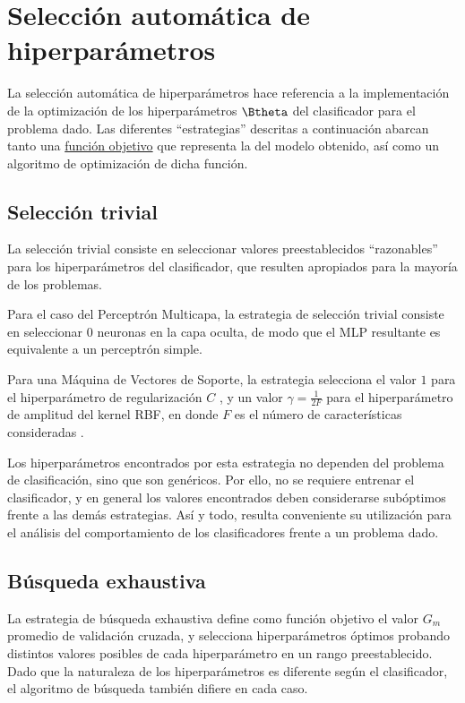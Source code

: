 \section{Selección automática de hiperparámetros}
La selección automática de hiperparámetros hace referencia a la
implementación de la optimización de los hiperparámetros $\Btheta$ del
clasificador para el problema dado.  Las diferentes ``estrategias''
descritas a continuación abarcan tanto una
\hyperref[funcobjetivo]{función objetivo} que representa la
 del modelo obtenido, así como un algoritmo de optimización
de dicha función.

\subsection{Selección trivial}
La selección trivial consiste en seleccionar valores preestablecidos
``razonables'' para los hiperparámetros del clasificador, que resulten
apropiados para la mayoría de los problemas.

Para el caso del Perceptrón Multicapa, la estrategia de selección
trivial consiste en seleccionar $0$ neuronas en la capa oculta, de
modo que el MLP resultante es equivalente a un perceptrón simple.

Para una Máquina de Vectores de Soporte, la estrategia selecciona el
valor $1$ para el hiperparámetro de regularización $C$ \cite{libsvm}, y
un valor $\gamma=\frac{1}{2F}$ para el hiperparámetro de amplitud del
kernel RBF, en donde $F$ es el número de características consideradas
\cite{glasmachersigel}.

Los hiperparámetros encontrados por esta estrategia no dependen del
problema de clasificación, sino que son genéricos. Por ello, no se
requiere entrenar el clasificador, y en general los valores
encontrados deben considerarse subóptimos frente a las demás
estrategias.  Así y todo, resulta conveniente su utilización para el
análisis del comportamiento de los clasificadores frente a un problema
dado.

\subsection{Búsqueda exhaustiva}
La estrategia de búsqueda exhaustiva define como función objetivo el
valor $G_m$ promedio de validación cruzada, y selecciona
hiperparámetros óptimos probando distintos valores posibles de cada
hiperparámetro en un rango preestablecido.  Dado que la naturaleza de
los hiperparámetros es diferente según el clasificador, el algoritmo
de búsqueda también difiere en cada caso.

